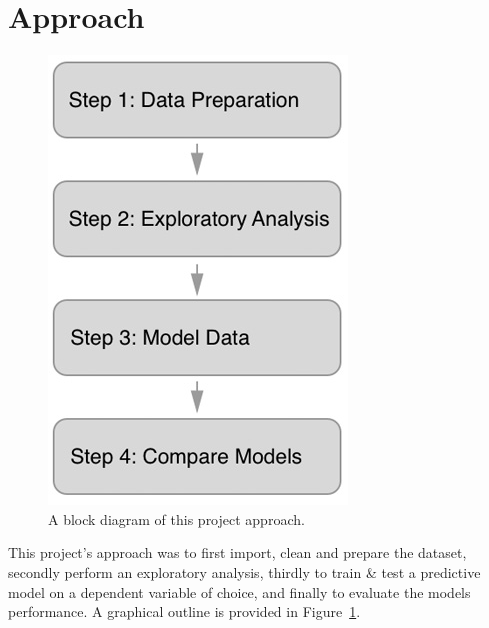 \documentclass[12pt,letterpaper, oneside]
{article}
\begin{document}
\section{Approach}
\begin{figure}
	\centering
	\includegraphics[width=\textwidth]{block-diagram}
	\caption{
		A block diagram of this project approach.
		\label{fig:blocks}
	}
\end{figure}

This project's approach was to first import, clean and prepare the dataset, secondly perform an exploratory analysis, thirdly to train \& test a predictive model on a dependent variable of choice, and finally to evaluate the models performance. A graphical outline is provided in Figure~\ref{fig:blocks}.
\end{document}
